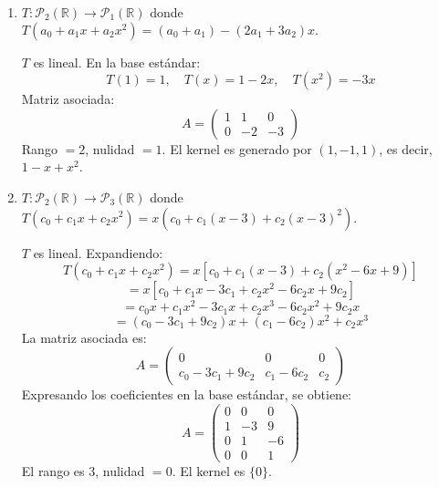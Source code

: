 \begin{prob}
\begin{enumerate}[$a)$]
\item $T:\mathcal{P}_{2}(\mathbb{R}) \rightarrow \mathcal{P}_{1}(\mathbb{R})$ donde $T(a_0+a_1x+a_2x^2) =(a_0+a_1)-(2a_1+3a_2)x.$
\begin{myproof}
$T$ es lineal. En la base estándar:
\[
T(1) = 1, \quad T(x) = 1 - 2x, \quad T(x^2) = -3x
\]
Matriz asociada:
\[
A = \begin{pmatrix}
1 & 1 & 0 \\
0 & -2 & -3
\end{pmatrix}
\]
Rango $=2$, nulidad $=1$. El kernel es generado por $(1, -1, 1)$, es decir, $1 - x + x^2$.
\end{myproof}

\item $T:\mathcal{P}_{2}(\mathbb{R}) \rightarrow \mathcal{P}_{3}(\mathbb{R})$ donde $T(c_0+c_1x+c_2x^2)=x(c_0+c_1(x-3)+c_2(x-3)^2).$
\begin{myproof}
$T$ es lineal. Expandiendo:
\[
T(c_0+c_1x+c_2x^2) = x\left[c_0 + c_1(x-3) + c_2(x^2 - 6x + 9)\right]
\]
\[
= x[c_0 + c_1x - 3c_1 + c_2x^2 - 6c_2x + 9c_2]
\]
\[
= c_0 x + c_1 x^2 - 3c_1 x + c_2 x^3 - 6c_2 x^2 + 9c_2 x
\]
\[
= (c_0 - 3c_1 + 9c_2)x + (c_1 - 6c_2)x^2 + c_2 x^3
\]
La matriz asociada es:
\[
A = \begin{pmatrix}
0 & 0 & 0 \\
c_0 - 3c_1 + 9c_2 & c_1 - 6c_2 & c_2
\end{pmatrix}
\]
Expresando los coeficientes en la base estándar, se obtiene:
\[
A = \begin{pmatrix}
0 & 0 & 0 \\
1 & -3 & 9 \\
0 & 1 & -6 \\
0 & 0 & 1
\end{pmatrix}
\]
El rango es $3$, nulidad $=0$. El kernel es $\{0\}$.
\end{myproof}

\end{enumerate}
\end{prob}


